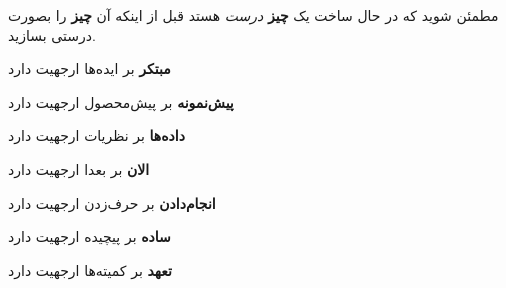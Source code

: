مطمئن شوید که در حال ساخت یک \textbf{چیز} \emph{درست} هستد قبل از اینکه
آن \textbf{چیز} را بصورت درستی بسازید.

\textbf{مبتکر} بر ایده‌ها ارجهیت دارد

\textbf{پیش‌نمونه} بر پیش‌محصول ارجهیت دارد

\textbf{داد‌‌ه‌ها} بر نظریات ارجهیت دارد

\textbf{الان} بر بعدا ارجهیت دارد

\textbf{انجام‌دادن} بر حرف‌زدن ارجهیت دارد

\textbf{ساده} بر پیچیده ارجهیت دارد

\textbf{تعهد} بر کمیته‌ها ارجهیت دارد
